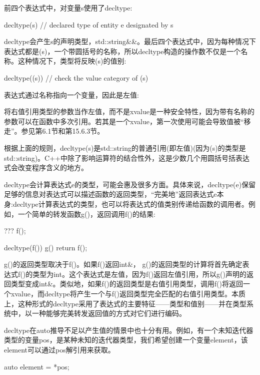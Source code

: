 前四个表达式中，对变量s使用了decltype:

\begin{cpp}
decltype(s) // declared type of entity e designated by s
\end{cpp}

decltype会产生s的声明类型，std::string\&\&。最后四个表达式中，因为每种情况下表达式都是(s)，一个带圆括号的名称，所以decltype构造的操作数不仅是一个名称。这种情况下，类型将反映(s)的值别:

\begin{cpp}
decltype((s)) // check the value category of (s)
\end{cpp}

表达式通过名称指向一个变量，因此是左值:

\begin{notice}
将右值引用类型的参数当作左值，而不是xvalue是一种安全特性，因为带有名称的参数可以在函数中多次引用。若其是一个xvalue，第一次使用可能会导致值被“移走”。参见第6.1节和第15.6.3节。
\end{notice}

根据上面的规则，decltype(s)是std::string的普通引用(即左值)(因为(s)的类型是std::string)。C++中除了影响运算符的结合性外，这是少数几个用圆括号括表达式会改变程序含义的地方。

decltype会计算表达式e的类型，可能会惠及很多方面。具体来说，decltype(e)保留足够的信息对表达式可以描述函数的返回类型，“完美地”返回表达式e本身:decltype计算表达式的类型，也可以将表达式的值类别传递给函数的调用者。例如，一个简单的转发函数g()，返回调用f()的结果:

\begin{cpp}
??? f();

decltype(f()) g()
{
	return f();
}
\end{cpp}

g()的返回类型取决于f()。如果f()返回int\&， g()的返回类型的计算将首先确定表达式f()的类型为int。这个表达式是左值，因为f()返回左值引用，所以g()声明的返回类型变成int\&。类似地，如果f()的返回类型是右值引用类型，调用f()将返回一个xvalue，而decltype将产生一个与f()返回类型完全匹配的右值引用类型。本质上，这种形式的decltype采用了表达式的主要特征——类型和值别——并在类型系统中，以一种能够完美转发返回值的方式对它们进行编码。

decltype在auto推导不足以产生值的情景中也十分有用。例如，有一个未知迭代器类型的变量pos，是某种未知的迭代器类型，我们希望创建一个变量element，该element可以通过pos解引用来获取。

\begin{cpp}
auto element = *pos;
\end{cpp}

